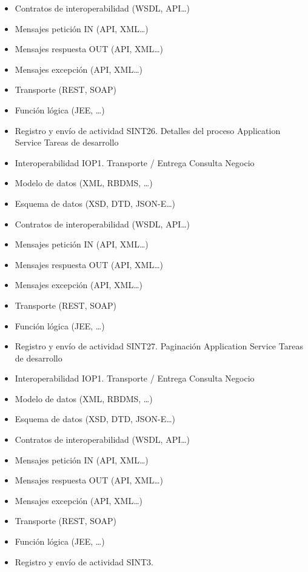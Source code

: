 \documentclass[
  paper=a4,
  ,captions=tableheading
]{scrartcl}
\begin{document}
\begin{itemize}
\item
  Contratos de interoperabilidad (WSDL, API\ldots)
\item
  Mensajes petición IN (API, XML\ldots)
\item
  Mensajes respuesta OUT (API, XML\ldots)
\item
  Mensajes excepción (API, XML\ldots)
\item
  Transporte (REST, SOAP)
\item
  Función lógica (JEE, \ldots)
\item
  Registro y envío de actividad \textbar{} \textbar{} SINT26. Detalles
  del proceso \textbar{} Application Service \textbar{} Tareas de
  desarrollo
\item
  Interoperabilidad IOP1. Transporte / Entrega Consulta Negocio\\
\item
  Modelo de datos (XML, RBDMS, \ldots)
\item
  Esquema de datos (XSD, DTD, JSON-E\ldots)
\item
  Contratos de interoperabilidad (WSDL, API\ldots)
\item
  Mensajes petición IN (API, XML\ldots)
\item
  Mensajes respuesta OUT (API, XML\ldots)
\item
  Mensajes excepción (API, XML\ldots)
\item
  Transporte (REST, SOAP)
\item
  Función lógica (JEE, \ldots)
\item
  Registro y envío de actividad \textbar{} \textbar{} SINT27. Paginación
  \textbar{} Application Service \textbar{} Tareas de desarrollo
\item
  Interoperabilidad IOP1. Transporte / Entrega Consulta Negocio\\
\item
  Modelo de datos (XML, RBDMS, \ldots)
\item
  Esquema de datos (XSD, DTD, JSON-E\ldots)
\item
  Contratos de interoperabilidad (WSDL, API\ldots)
\item
  Mensajes petición IN (API, XML\ldots)
\item
  Mensajes respuesta OUT (API, XML\ldots)
\item
  Mensajes excepción (API, XML\ldots)
\item
  Transporte (REST, SOAP)
\item
  Función lógica (JEE, \ldots)
\item
  Registro y envío de actividad \textbar{} \textbar{} SINT3.

\end{itemize}
\end{document}
